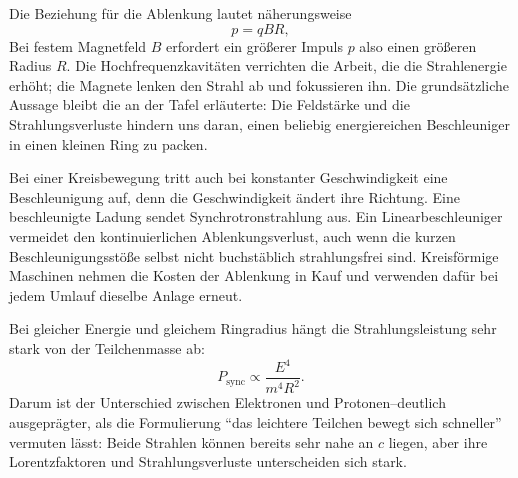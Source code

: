Die Beziehung für die Ablenkung lautet näherungsweise
\begin{equation}
p=qBR,
\end{equation}
Bei festem Magnetfeld \(B\) erfordert ein größerer Impuls \(p\) also einen größeren Radius \(R\). Die Hochfrequenzkavitäten verrichten die Arbeit, die die Strahlenergie erhöht; die Magnete lenken den Strahl ab und fokussieren ihn. Die grundsätzliche Aussage bleibt die an der Tafel erläuterte: Die Feldstärke und die Strahlungsverluste hindern uns daran, einen beliebig energiereichen Beschleuniger in einen kleinen Ring zu packen.

Bei einer Kreisbewegung tritt auch bei konstanter Geschwindigkeit eine Beschleunigung auf, denn die Geschwindigkeit ändert ihre Richtung. Eine beschleunigte Ladung sendet Synchrotronstrahlung aus. Ein Linearbeschleuniger vermeidet den kontinuierlichen Ablenkungsverlust, auch wenn die kurzen Beschleunigungsstöße selbst nicht buchstäblich strahlungsfrei sind. Kreisförmige Maschinen nehmen die Kosten der Ablenkung in Kauf und verwenden dafür bei jedem Umlauf dieselbe Anlage erneut.

\begin{classroomqa}
\end{classroomqa}

Bei gleicher Energie und gleichem Ringradius hängt die Strahlungsleistung sehr stark von der Teilchenmasse ab:
\begin{equation}
P_{\mathrm{sync}}\propto \frac{E^4}{m^4R^2}.
\end{equation}
Darum ist der Unterschied zwischen Elektronen und Protonen--deutlich ausgeprägter, als die Formulierung ``das leichtere Teilchen bewegt sich schneller'' vermuten lässt: Beide Strahlen können bereits sehr nahe an \(c\) liegen, aber ihre Lorentzfaktoren und Strahlungsverluste unterscheiden sich stark.

